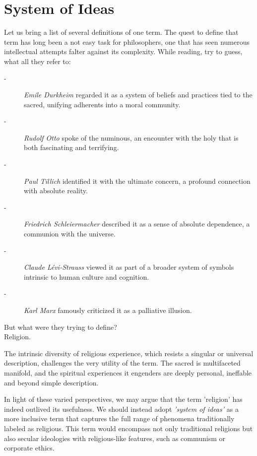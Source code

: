 \documentclass[12pt,a4]{article}
\begin{document}



 
\section{System of Ideas}
Let us bring a list of several definitions of one term. The quest to define that term has long been a not easy task for philosophers, one that has seen numerous intellectual attempts falter against its complexity. 
While reading, try to guess, what all they refer to:  

\begin{description}
    \item[-] \textit{Emile Durkheim} regarded it as a system of beliefs and practices tied to the sacred, unifying adherents into a moral community.
    \item[-] \textit{Rudolf Otto} spoke of the numinous, an encounter with the holy that is both fascinating and terrifying.
    \item[-] \textit{Paul Tillich }identified it with the ultimate concern, a profound connection with absolute reality.
    \item[-] \textit{Friedrich Schleiermacher} described it as a sense of absolute dependence, a communion with the universe.
    \item[-] \textit{Claude Lévi-Strauss} viewed it as part of a broader system of symbols intrinsic to human culture and cognition.
    \item[-] \textit{Karl Marx} famously criticized it as a palliative illusion.
\end{description}    

But what were they trying to define?\\
Religion.
 
 \par
The intrinsic diversity of religious experience, which resists a singular or universal description, challenges the very utility of the term. The sacred is multifaceted manifold, and the spiritual experiences it engenders are deeply personal, ineffable and beyond simple description.

\par
In light of these varied perspectives, we may argue that the term 'religion' has indeed outlived its usefulness. We should instead adopt \textit{'system of ideas'} as a more inclusive term that captures the full range of phenomena traditionally labeled as religious. This term would encompass not only traditional religions but also secular ideologies with religious-like features, such as communism or corporate ethics.
\end{document}

